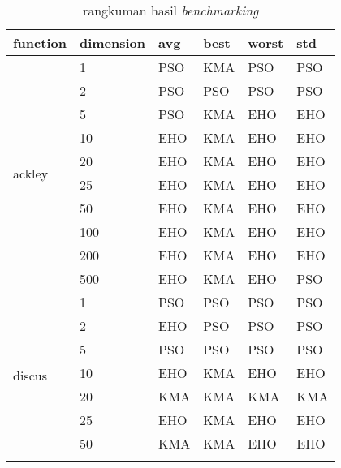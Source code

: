 \begin{longtable}[c]{|p{3.5cm}|l|l|l|l|l|}
\caption{rangkuman hasil \textit{benchmarking}}
\label{tab:summary-result}\\
\hline
function                               & dimension & avg & best & worst & std \\ \hline
\endfirsthead
%
\endhead
%
\multirow[t]{10}{*}{ackley}               & 1         & PSO & KMA  & PSO   & PSO \\ \cline{2-6} 
                                       & 2         & PSO & PSO  & PSO   & PSO \\ \cline{2-6} 
                                       & 5         & PSO & KMA  & EHO   & EHO \\ \cline{2-6} 
                                       & 10        & EHO & KMA  & EHO   & EHO \\ \cline{2-6} 
                                       & 20        & EHO & KMA  & EHO   & EHO \\ \cline{2-6} 
                                       & 25        & EHO & KMA  & EHO   & EHO \\ \cline{2-6} 
                                       & 50        & EHO & KMA  & EHO   & EHO \\ \cline{2-6} 
                                       & 100       & EHO & KMA  & EHO   & EHO \\ \cline{2-6} 
                                       & 200       & EHO & KMA  & EHO   & EHO \\ \cline{2-6} 
                                       & 500       & EHO & KMA  & EHO   & PSO \\ \hline
\multirow[t]{10}{*}{discus}               & 1         & PSO & PSO  & PSO   & PSO \\ \cline{2-6} 
                                       & 2         & EHO & PSO  & PSO   & PSO \\ \cline{2-6} 
                                       & 5         & PSO & PSO  & PSO   & PSO \\ \cline{2-6} 
                                       & 10        & EHO & KMA  & EHO   & EHO \\ \cline{2-6} 
                                       & 20        & KMA & KMA  & KMA   & KMA \\ \cline{2-6} 
                                       & 25        & EHO & KMA  & EHO   & EHO \\ \cline{2-6} 
                                       & 50        & KMA & KMA  & EHO   & EHO \\ \cline{2-6} 

\end{longtable}
